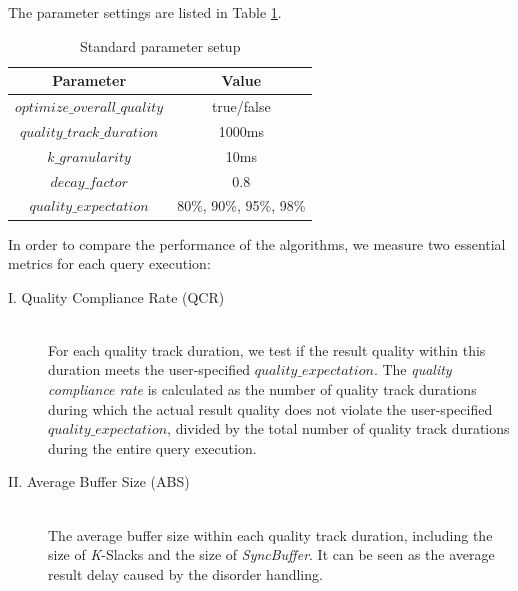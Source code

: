 \documentclass[a4paper, 11pt, twoside]{report}
\begin{document}
The parameter settings are listed in Table \ref{table:parameter-setup}.\\

\begin{table}[h]
\begin{center}
\begin{tabular}{|c|c|}
\hline
Parameter                    & Value                  \\ \hline
$optimize\_overall\_quality$ & true/false             \\ \hline
$quality\_track\_duration$   & 1000ms                 \\ \hline
$k\_granularity$             & 10ms                   \\ \hline
$decay\_factor$         	 & 0.8                    \\ \hline
$quality\_expectation$       & 80\%, 90\%, 95\%, 98\% \\ \hline
\end{tabular}
\caption{Standard parameter setup\label{table:parameter-setup}}
\end{center}
\end{table}

In order to compare the performance of the algorithms, we measure two essential metrics for each query execution:\\

\begin{description}
\item[I. Quality Compliance Rate (QCR)]\hspace*{\fill} \\

For each quality track duration, we test if the result quality within this duration meets the user-specified $quality\_expectation$. The \emph{quality compliance rate} is calculated as the number of quality track durations during which the actual result quality does not violate the user-specified $quality\_expectation$, divided by the total number of quality track durations during the entire query execution.\\

\item[II. Average Buffer Size (ABS)]\hspace*{\fill} \\

The average buffer size within each quality track duration, including the size of \textit{K}-Slacks and the size of \textit{SyncBuffer}. It can be seen as the average result delay caused by the disorder handling.\\
\end{description}
\end{document}
